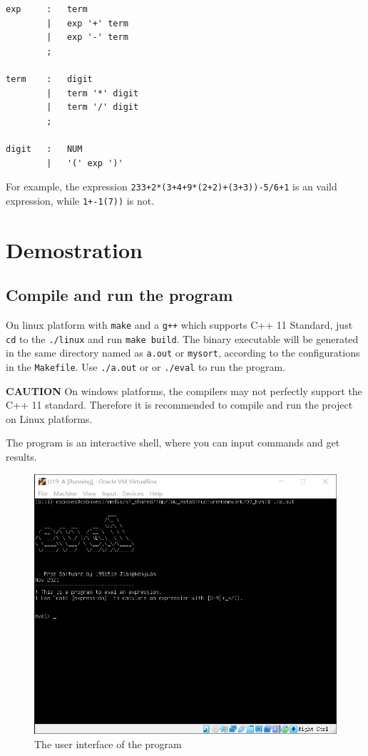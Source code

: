 \documentclass[cn,black,12pt,normal]{elegantnote}
\begin{document}
\begin{lstlisting}
exp     :	term			    
		|   exp '+' term		
		|   exp '-' term		
		;
 
term	:	digit               
		|   term '*' digit		
		|	term '/' digit		
		;
 
digit	:	NUM                 			
		|   '(' exp ')'        
\end{lstlisting}

For example, the expression \lstinline{233+2*(3+4+9*(2+2)+(3+3))-5/6+1} is an vaild expression, while \lstinline{1+-1(7))} is not.


\section{Demostration}

\subsection{Compile and run the program}

On linux platform with \lstinline{make} and a \lstinline{g++} which supports C++ 11 Standard, just \lstinline{cd} to the \lstinline{./linux} and run \lstinline{make build}. The binary executable will be generated in the same directory named as \lstinline{a.out} or \lstinline{mysort}, according to the configurations in the \lstinline{Makefile}. Use \lstinline{./a.out} or or \lstinline{./eval} to run the program.

\textbf{CAUTION} On windows platforms, the compilers may not perfectly support the C++ 11 standard. Therefore it is recommended to compile and run the project on Linux platforms.

The program is an interactive shell, where you can input commands and get results.

\begin{figure}[H]
    \centering
    \includegraphics[width=0.7\linewidth]{image/e01.jpg}
    \caption{The user interface of the program}
\end{figure}
\end{document}
